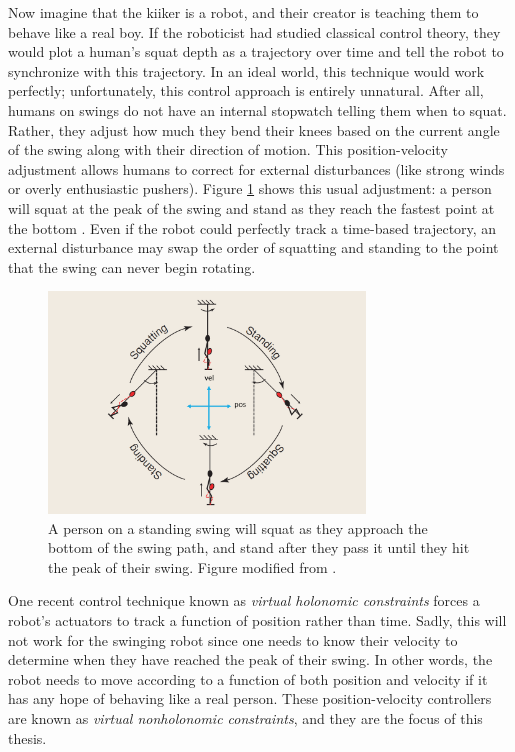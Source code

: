 Now imagine that the kiiker is a robot, and their creator is teaching them to
behave like a real boy.
If the roboticist had studied classical control theory, they would plot 
a human's squat depth as a trajectory over time and tell the robot to
synchronize with this trajectory.
In an ideal world, this technique would work perfectly; unfortunately, this
control approach is entirely unnatural. 
After all, humans on swings do not have an internal stopwatch telling them when
to squat.
Rather, they adjust how much they bend their knees based on the current angle of
the swing along with their direction of motion.
This position-velocity adjustment allows humans to correct for external
disturbances (like strong winds or overly enthusiastic pushers). 
Figure \ref{fig:swing-pos-vel} shows this usual adjustment:
a person will squat at the peak of the swing and stand as they reach the fastest
point at the bottom \cite{pumping_swing_standing_squatting}.
Even if the robot could perfectly track a time-based trajectory, an external
disturbance may swap the order of squatting and standing to the point that
the swing can never begin rotating.

\begin{figure}
    \centering
    \includegraphics[width=0.75\textwidth]{images/swing_pos_vel.png}
    \caption{A person on a standing swing will squat as they approach the
        bottom of the swing path, and stand after they pass it until they hit
        the peak of their swing. Figure modified from
    \cite{pumping_swing_standing_squatting}.}
    \label{fig:swing-pos-vel}
\end{figure}

One recent control technique known as \textit{virtual holonomic constraints}
\cite{vhcs_for_el_systems} forces a robot's actuators to track a function of
position rather than time.
Sadly, this will not work for the swinging robot since one needs to know their
velocity to determine when they have reached the peak of their swing.
In other words, the robot needs to move according to a function of both position
and velocity if it has any hope of behaving like a real person.
These position-velocity controllers are known as 
\textit{virtual nonholonomic constraints}, and they are the focus of this
thesis.

